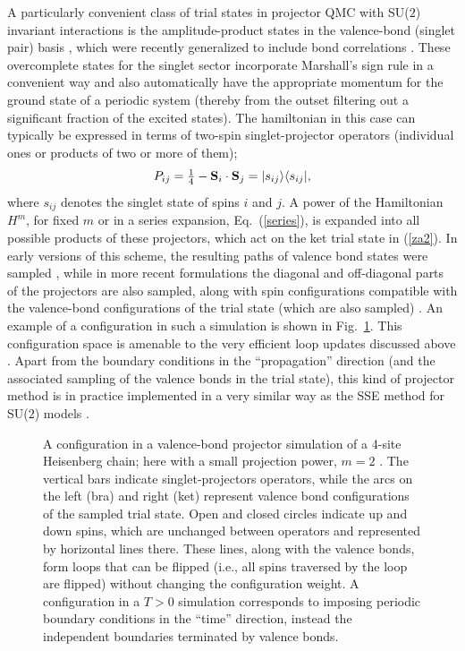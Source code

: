 \documentclass[range]{ar2e}
\begin{document}
A particularly convenient class of trial states in projector QMC with SU($2$) invariant interactions is the amplitude-product states in the valence-bond
(singlet pair) basis \cite{Liang88}, which were recently generalized to include bond correlations \cite{Lin12}. These overcomplete states for the singlet 
sector incorporate Marshall's sign rule in a convenient way and also automatically have the appropriate momentum for the ground state of a periodic system 
(thereby from the outset filtering out a significant fraction of the excited states). The hamiltonian in this case can typically be expressed in terms of 
two-spin singlet-projector operators  (individual ones or products of two or more of them);
\begin{equation}
P_{ij}=\hbox{$\frac{1}{4}$}-{\bf S}_i\cdot {\bf S}_j = |s_{ij}\rangle\langle s_{ij}|,
\label{psinglet}
\end{equation}
where $s_{ij}$ denotes the singlet state of spins $i$ and $j$. A power of the Hamiltonian $H^m$, for fixed $m$ or in a series expansion, Eq.~(\ref{series}),
is expanded into all possible products of these projectors, which act on the ket trial state in (\ref{za2}). In early versions of this scheme, the resulting 
paths of valence bond states were sampled \cite{Liang90,Santoro99,Sandvik05}, while in more recent formulations the diagonal and off-diagonal parts of the 
projectors are also sampled, along with spin configurations compatible with the valence-bond configurations of the trial state (which are also sampled) 
\cite{Sandvik10c}. An example of a configuration in such a simulation is shown in Fig.~\ref{loops}. This configuration space is amenable to the very efficient 
loop updates discussed above \cite{Sandvik10a}. Apart from the boundary conditions in the ``propagation'' direction (and the associated sampling of the
valence bonds in the trial state), this kind of projector method is in practice implemented in a very similar way as the SSE method for SU($2$) 
models \cite{Sandvik10b}.

\begin{figure}
\centerline{}
\caption{A configuration in a valence-bond projector simulation of a 4-site Heisenberg chain; here with a small projection power, 
$m=2$ \cite{Sandvik10a}. The vertical bars indicate singlet-projectors operators, while the arcs on the left (bra) and right (ket) represent 
valence bond configurations of the sampled trial state. Open and closed circles indicate up and down spins, which are unchanged between 
operators and represented by horizontal lines there. These lines, along with the valence bonds, form loops that can be flipped (i.e., 
all spins traversed by the loop are flipped) without changing the configuration weight. A configuration in a $T>0$ simulation corresponds 
to imposing periodic boundary conditions in the ``time'' direction, instead the independent boundaries terminated by valence bonds.}
\label{loops}
\end{figure}
\end{document}
